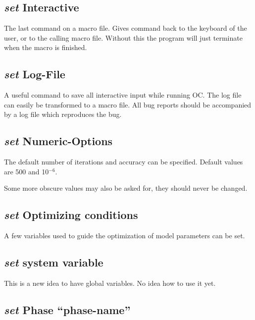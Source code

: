 \documentclass[11pt]{article}
\begin{document}
\subsection{{\em set} Interactive}

The last command on a macro file.  Gives command back to the keyboard
of the user, or to the calling macro file.  Without this the program
will just terminate when the macro is finished.

\hypertarget{Set logfile}{}
\subsection{{\em set} Log-File}

A useful command to save all interactive input while running OC.  The
log file can easily be transformed to a macro file.  All bug reports
should be accompanied by a log file which reproduces the bug.

\hypertarget{Set numeric}{}
\subsection{{\em set} Numeric-Options}

The default number of iterations and accuracy can be specified.
Default values are 500 and 10$^{-6}$.

Some more obscure values may also be asked for, they should never be
changed.

\hypertarget{Set optimizer conditions}{}
\subsection{{\em set} Optimizing conditions}

A few variables used to guide the optimization of model parameters can
be set.

\hypertarget{Set system variable}{}
\subsection{{\em set} system variable}

This is a new idea to have global variables.  No idea how to use it
yet.

\hypertarget{Set phase}{}
\hypertarget{Set for phase}{}
\subsection{{\em set} Phase ``phase-name''}
\end{document}
